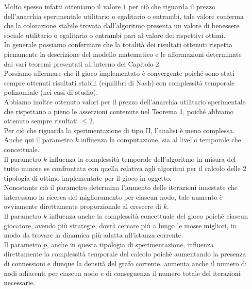 Molto spesso infatti otteniamo il valore $1$ per ciò che riguarda il prezzo dell'anarchia sperimentale utilitario o egalitario o entrambi, tale valore conferma che la colorazione stabile trovata dall'algoritmo presenta un valore di benessere sociale utilitario o egalitario o entrambi pari al valore dei rispettivi ottimi.\\

In generale possiamo confermare che la totalità dei risultati ottenuti rispetta pienamente la descrizione del modello matematico e le affermazioni determinate dai vari teoremi presentati all'interno del Capitolo 2.\\
Possiamo affermare che il gioco implementato è convergente poiché sono stati sempre ottenuti risultati stabili (equilibri di Nash) con complessità temporale polinomiale (nei casi di studio).\\
Abbiamo inoltre ottenuto valori per il prezzo dell'anarchia utilitario sperimentale che rispettano a pieno le asserzioni contenute nel Teorema 1, poiché abbiamo ottenuto sempre risultati \(\leq 2\).\\

Per ciò che riguarda la sperimentazione di tipo II, l'analisi è meno complessa.\\
Anche qui il parametro $k$ influenza la computazione, sia al livello temporale che concettuale.\\
Il parametro $k$ influenza la complessità temporale dell'algoritmo in misura del tutto minore se confrontata con quella relativa agli algoritmi per il calcolo delle 2 tipologia di ottimo implementate per il gioco in oggetto.\\
Nonostante ciò il parametro determina l'aumento delle iterazioni innestate che interessano la ricerca del miglioramento per ciascun nodo, tale aumento è ovviamente direttamente proporzionale al crescere di $k$.\\

Il parametro $k$ influenza anche la complessità concettuale del gioco poiché ciascun giocatore, avendo più strategie, dovrà cercare più a lungo le mosse migliori, in modo da trovare la dinamica più adatta all'istanza corrente.\\

Il parametro $p$, anche in questa tipologia di sperimentazione, influenza direttamente la complessità temporale del calcolo poiché aumentando la presenza di connessioni e dunque la densità del grafo corrente, aumenta anche il numero di nodi adiacenti per ciascun nodo e di conseguenza il numero totale del iterazioni necessarie.\\


